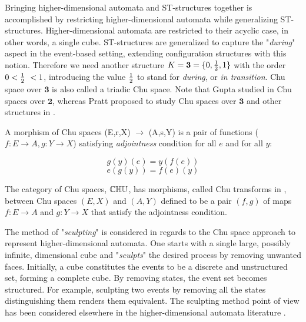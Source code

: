     Bringing higher-dimensional automata and ST-structures together is accomplished by restricting higher-dimensional automata while generalizing ST-structures. Higher-dimensional automata are restricted to their acyclic case, in other words, a single cube. ST-structures are generalized to capture the "\emph{during}" aspect in the event-based setting, extending configuration structures with this notion. Therefore we need another structure $K= \mathbf{3}= \{0, \frac{1}{2} , 1\}$ with the order $0 < \frac{1}{2}\ < 1$, introducing the value $\frac{1}{2}$ to stand for \textit{during}, or \textit{in transition}. Chu space over $\mathbf{3}$ is also called a triadic Chu space. Note that Gupta studied in \cite{gupta94phd_Chu} Chu spaces over $\mathbf{2}$, whereas Pratt proposed to study Chu spaces over $\mathbf{3}$ and other structures in \cite{Pratt03trans_cancel}.

    \begin{definition}
        \label{def:morphism_of_Chu_spaces}
        A morphism of Chu spaces (E,r,X) $\rightarrow$ (A,s,Y) is a pair of functions ($f:E \rightarrow A, g:Y \rightarrow X$) satisfying \emph{adjointness} condition for all $e$ and for all $y$:
        
        \begin{equation}
            g(y)(e) = y(f(e))\label{categoryChu1}
        \end{equation} 
        \begin{equation}
            e(g(y)) = f(e)(y)\label{categoryChu2}
        \end{equation} 
    \end{definition}
    
    The category of Chu spaces, $\mathbb{CHU}$, has morphisms, called Chu transforms in \cite[Chapter 4]{gupta94phd_Chu}, between Chu spaces $(E,X)$ and $(A,Y)$ defined to be a pair $(f,g)$ of maps $f: E \rightarrow A$ and $g: Y \rightarrow X$ that satisfy the adjointness condition.
    
    The method of "\emph{sculpting}" is considered in regards to the Chu space approach to represent higher-dimensional automata. One starts with a single large, possibly infinite, dimensional cube and "\emph{sculpts}" the desired process by removing unwanted faces. Initially, a cube constitutes the events to be a discrete and unstructured set, forming a complete cube. By removing states, the event set becomes structured. For example, sculpting two events by removing all the states distinguishing them renders them equivalent. The sculpting method point of view has been considered elsewhere in the higher-dimensional automata literature \cite{Goubault92homologyof, Fajstrup98detectingdeadlocks}.
    
